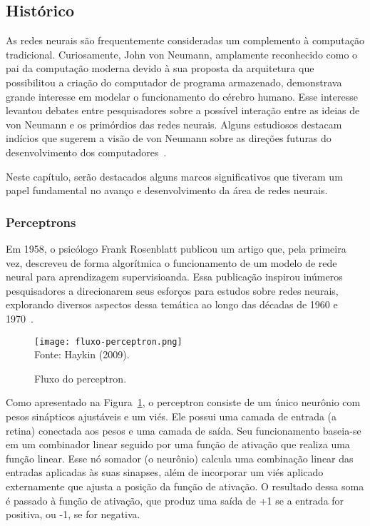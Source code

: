     \subsection{Histórico}
        As redes neurais são frequentemente consideradas um complemento à computação tradicional. Curiosamente, 
        John von Neumann, amplamente reconhecido como o pai da computação moderna devido à sua proposta da arquitetura 
        que possibilitou a criação do computador de programa armazenado, demonstrava grande interesse em modelar o 
        funcionamento do cérebro humano. Esse interesse levantou debates entre pesquisadores sobre a possível interação 
        entre as ideias de von Neumann e os primórdios das redes neurais. Alguns estudiosos destacam indícios que 
        sugerem a visão de von Neumann sobre as direções futuras do desenvolvimento dos computadores~\cite{Fausett1994}.

        Neste capítulo, serão destacados alguns marcos significativos que tiveram um papel fundamental no avanço e
        desenvolvimento da área de redes neurais.


        \subsubsection{Perceptrons}
            
            Em 1958, o psicólogo Frank Rosenblatt publicou um artigo que, pela primeira vez, descreveu de forma 
            algorítmica o funcionamento de um modelo de rede neural para aprendizagem supervisioanda. Essa 
            publicação inspirou inúmeros pesquisadores a direcionarem seus esforços para estudos sobre redes neurais, 
            explorando diversos aspectos dessa temática ao longo das décadas de 1960 e 1970~\cite{haykin2009neural}.

            \begin{figure}[!htb]
                \centering
                \caption{Fluxo do perceptron.}
                \texttt{[image: fluxo-perceptron.png]}\\
                {\footnotesize Fonte: Haykin (2009).}\
                \label{fig:fluxo-perceptron}
            \end{figure}

            Como apresentado na Figura~\ref{fig:fluxo-perceptron}, o perceptron consiste de um único neurônio com 
            pesos sinápticos ajustáveis e um viés. Ele possui uma camada de entrada (a retina) conectada aos pesos e 
            uma camada de saída. Seu funcionamento baseia-se em um combinador linear seguido por uma função de 
            ativação que realiza uma função linear. Esse nó somador (o neurônio) calcula uma combinação linear das 
            entradas aplicadas às suas sinapses, além de incorporar um viés aplicado externamente que ajusta a posição
            da função de ativação. O resultado dessa soma é passado à função de ativação, que produz uma saída de +1 
            se a entrada for positiva, ou -1, se for negativa. 
            
